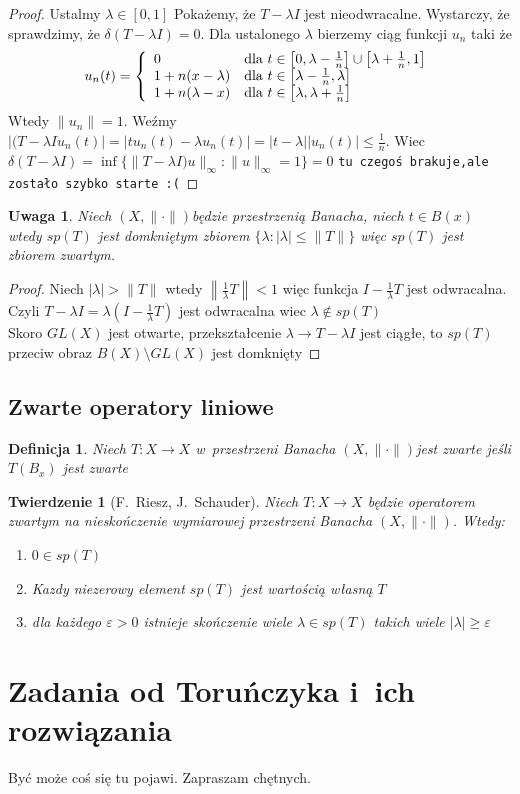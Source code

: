 \documentclass[11pt]{mwrep}
\renewcommand{\[}{\begin{equation}}
\renewcommand{\]}{\end{equation}}
\newcommand{\norm}{\|\cdot\|}
\newcommand{\spac}[1][X]{$(#1,\norm)$}
\newtheorem{twr}[subsection]{Twierdzenie}%
\newtheorem{uwaga}[subsection]{Uwaga}
\newtheorem{de}[subsection]{Definicja}
\newcounter{numer}
\begin{document}
\begin{proof}
	Ustalmy $\lambda \in [0,1]$ Pokażemy, że $T -\lambda I$ jest nieodwracalne. Wystarczy, że sprawdzimy, że $\delta(T-\lambda I) =0$.
	Dla ustalonego $\lambda$ bierzemy ciąg funkcji $u_n$ taki że 
	$$u_n(t) = \left\{
		\begin{array}[]{ll}
		 	0 & \textrm{dla } t \in \left[0,\lambda-\frac{1}{n}\right] \cup \left[ \lambda+\frac{1}{n}, 1 \right]\\
			1 + n(x -\lambda) & \textrm{dla } t \in \left[ \lambda-\frac{1}{n},\lambda \right]\\
			1+n(\lambda -x)	& \textrm{dla } t \in \left[ \lambda,\lambda+\frac{1}{n} \right]
		\end{array}\right.
	$$
	Wtedy $\|u_n\|=1$. Weźmy $|(T- \lambda I u_n(t)| = |tu_n(t) - \lambda u_n(t)| = |t-\lambda| |u_n(t)| \le \frac{1}{n}$.
	Wiec $\delta(T-\lambda I)  = \inf \{ \|T-\lambda I )u \|_\infty : \|u\|_\infty =1\} = 0$ 
	\texttt{tu czegoś brakuje,ale zostało szybko starte :(}
\end{proof}
\begin{uwaga}
	Niech \spac będzie przestrzenią Banacha, niech $t\in B(x)$ wtedy $sp (T)$ jest domkniętym zbiorem 
	$\{\lambda : |\lambda| \le \|T\|\}$ więc $sp(T)$ jest zbiorem zwartym.
\end{uwaga}
\begin{proof}
	Niech $|\lambda| >\|T\|$ wtedy $\left\| \frac{1}{\lambda} T\right\|<1$ więc funkcja  $I- \frac{1}{\lambda}T$ jest odwracalna.
	Czyli $T - \lambda I = \lambda\left( I -\frac{1}{\lambda}T \right)$ jest odwracalna wiec $\lambda\not \in sp(T)$ \\
	Skoro $GL(X)$ jest otwarte, przekształcenie $\lambda \to T - \lambda I$ jest ciągłe, to $sp(T)$ przeciw obraz $B(X) \setminus GL(X)$ 
	jest domknięty
\end{proof}
\section{Zwarte operatory liniowe}
\begin{de}
	Niech $T\colon X\to X$ w~przestrzeni Banacha \spac jest zwarte jeśli $T(B_x)$ jest zwarte
\end{de}
\begin{twr}[F.~Riesz, J.~Schauder]
	Niech $T\colon X \to X$ będzie operatorem zwartym na nieskończenie wymiarowej przestrzeni Banacha \spac. Wtedy:
	\begin{enumerate}
		\item $0\in sp(T)$
		\item Kazdy niezerowy element $sp(T)$ jest wartością własną $T$ 
	\item dla każdego $\varepsilon>0$ istnieje  skończenie wiele $\lambda \in sp(T)$ takich wiele $|\lambda|\ge\varepsilon$ 
	\end{enumerate}
\end{twr}
\chapter{Zadania od Toruńczyka i~ich rozwiązania}
Być może coś się tu pojawi. Zapraszam chętnych. 


\printindex
\end{document}

